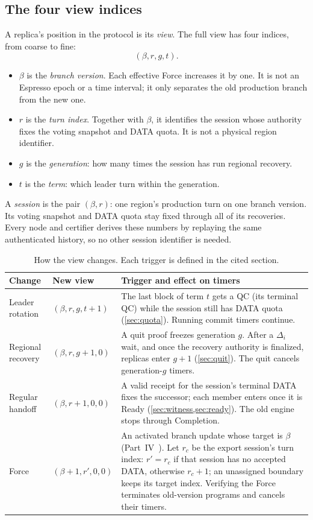 \documentclass[11pt,a4paper]{article}
\newcommand{\defterm}[1]{\textcolor{rrBlue}{\textit{#1}}}
\newcounter{protocol}
\begin{document}
\subsection{The four view indices}
A replica's position in the protocol is its \emph{view}. The full view
has four indices, from coarse to fine:
\[
 (\beta,r,g,t).
\]
\begin{itemize}
\item $\beta$ is the \defterm{branch version}. Each effective Force
increases it by one. It is not an Espresso epoch or a time interval; it
only separates the old production branch from the new one.
\item $r$ is the \defterm{turn index}. Together with $\beta$, it identifies
the session whose authority fixes the voting snapshot and DATA quota.
It is not a physical region identifier.
\item $g$ is the \defterm{generation}: how many times the session has
run regional recovery.
\item $t$ is the \defterm{term}: which leader turn within the
generation.
\end{itemize}
A \defterm{session} is the pair $(\beta,r)$: one region's production
turn on one branch version. Its voting snapshot and DATA quota stay
fixed through all of its recoveries. Every node and certifier derives
these numbers by replaying the same authenticated history, so no other
session identifier is needed.

\begin{table}[htbp]\centering\small
\caption{How the view changes. Each trigger is defined in the cited
section.}\label{tab:views}
\begin{tabularx}{\linewidth}{@{}>{\raggedright\arraybackslash}p{.19\linewidth}>{\raggedright\arraybackslash}p{.25\linewidth}Y@{}}\toprule
Change & New view & Trigger and effect on timers\\\midrule
Leader rotation & $(\beta,r,g,t+1)$ & The last block of term $t$ gets a
QC (its terminal QC) while the session still has DATA quota
(\cref{sec:quota}). Running commit timers continue.\\
Regional recovery & $(\beta,r,g+1,0)$ & A quit proof freezes generation
$g$. After a $\Delta_i$ wait, and once the recovery authority is
finalized, replicas enter $g+1$ (\cref{sec:quit}). The quit cancels
generation-$g$ timers.\\
Regular handoff & $(\beta,r+1,0,0)$ & A valid receipt for the session's
terminal DATA fixes the successor; each member enters once it is Ready
(\cref{sec:witness,sec:ready}). The old engine stops through
Completion.\\
Force & $(\beta+1,r',0,0)$ & An activated branch update whose target is
$\beta$ (Part~IV~\cite{part4}). Let $r_c$ be the export session's turn index:
$r'=r_c$ if that session has no accepted DATA, otherwise $r_c+1$; an
unassigned boundary keeps its target index. Verifying the Force
terminates old-version programs and cancels their timers.\\
\bottomrule\end{tabularx}
\end{table}
\end{document}
